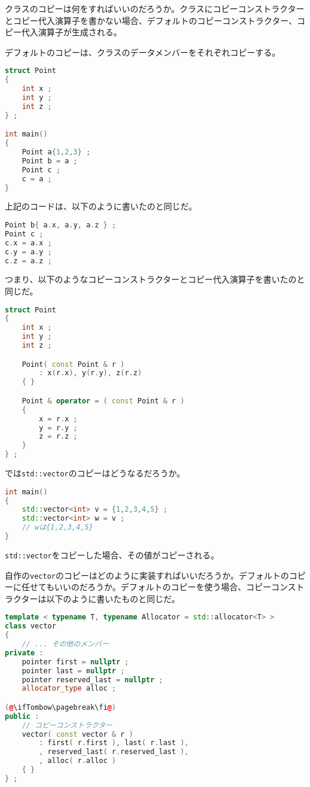 
クラスのコピーは何をすればいいのだろうか。クラスにコピーコンストラクターとコピー代入演算子を書かない場合、デフォルトのコピーコンストラクター、コピー代入演算子が生成される。

デフォルトのコピーは、クラスのデータメンバーをそれぞれコピーする。

\begin{lstlisting}[language={C++}]
struct Point
{
    int x ;
    int y ;
    int z ;
} ;

int main()
{
    Point a{1,2,3} ;
    Point b = a ;
    Point c ;
    c = a ;
}
\end{lstlisting}

上記のコードは、以下のように書いたのと同じだ。

\begin{lstlisting}[language={C++}]
Point b{ a.x, a.y, a.z } ;
Point c ;
c.x = a.x ;
c.y = a.y ;
c.z = a.z ;
\end{lstlisting}

つまり、以下のようなコピーコンストラクターとコピー代入演算子を書いたのと同じだ。

\ifTombow\pagebreak\fi
\begin{lstlisting}[language={C++}]
struct Point
{
    int x ;
    int y ;
    int z ;

    Point( const Point & r )
        : x(r.x), y(r.y), z(r.z)
    { }

    Point & operator = ( const Point & r )
    {
        x = r.x ;
        y = r.y ;
        z = r.z ;
    }
} ;
\end{lstlisting}

では\texttt{std::vector}のコピーはどうなるだろうか。

\begin{lstlisting}[language={C++}]
int main()
{
    std::vector<int> v = {1,2,3,4,5} ;
    std::vector<int> w = v ;
    // wは{1,2,3,4,5}
}
\end{lstlisting}

\texttt{std::vector}をコピーした場合、その値がコピーされる。

自作の\texttt{vector}のコピーはどのように実装すればいいだろうか。デフォルトのコピーに任せてもいいのだろうか。デフォルトのコピーを使う場合、コピーコンストラクターは以下のように書いたものと同じだ。

\begin{lstlisting}[language={C++}]
template < typename T, typename Allocator = std::allocator<T> >
class vector
{
    // ... その他のメンバー
private :
    pointer first = nullptr ;
    pointer last = nullptr ;
    pointer reserved_last = nullptr ;
    allocator_type alloc ;

(@\ifTombow\pagebreak\fi@)
public :
    // コピーコンストラクター
    vector( const vector & r )
        : first( r.first ), last( r.last ),
        , reserved_last( r.reserved_last ),
        , alloc( r.alloc )
    { }
} ;
\end{lstlisting}

